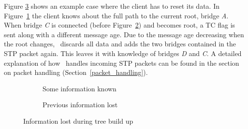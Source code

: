 Figure \ref{fig:information_lost} shows an example case where the client has to reset its data.
In Figure~\ref{fig:information_lost1} the client knows about the full path to the current root, bridge \textit{A}.
When bridge \textit{C} is connected (before Figure~\ref{fig:information_lost2}) and becomes root, a TC flag is sent along with a different message age.
Due to the message age decreasing when the root changes, \tool\ discards all data and adds the two bridges contained in the STP packet again.
This leaves it with knowledge of bridges \textit{D} and \textit{C}.
A detailed explanation of how \tool\ handles incoming STP packets can be found in the section on packet handling (Section~\ref{packet_handling}).

\begin{figure}[h]
    \begin{centering}
        \begin{subfigure}[b]{0.4\textwidth}
            \caption{Some information known}
            \label{fig:information_lost1}
        \end{subfigure}
        \hspace{1cm}
        \begin{subfigure}[b]{0.4\textwidth}
            \caption{Previous information lost}
            \label{fig:information_lost2}
        \end{subfigure}
        \caption{Information lost during tree build up}
        \label{fig:information_lost}
    \end{centering}
\end{figure}

